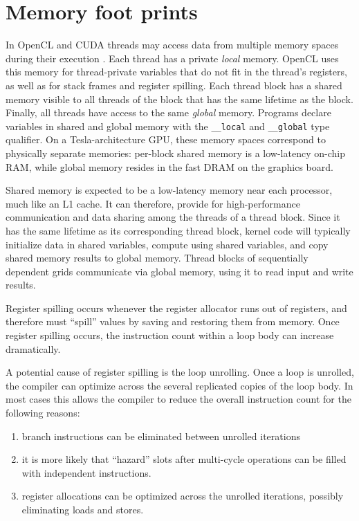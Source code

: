 \section{Memory foot prints}
In OpenCL and CUDA threads may access data from multiple memory spaces during their execution \cite{Nickolls2008}. Each thread has a private \textit{local} memory. 
OpenCL uses this memory for thread-private variables that do not fit in the thread's registers, as well as for stack frames and register spilling. Each thread block 
has a shared memory visible to all threads of the block that has the same lifetime as the block. Finally, all threads have access to the same \textit{global} memory. 
Programs declare variables in shared and global memory with the \texttt{\_\_local} and \texttt{\_\_global} type qualifier. On a Tesla-architecture GPU, these memory spaces correspond to 
physically separate memories: per-block shared memory is a low-latency on-chip RAM, while global memory resides in the fast DRAM on the graphics board. 

Shared memory is expected to be a low-latency memory near each processor, much like an L1 cache. It can therefore, provide for high-performance communication and
data sharing among the threads of a thread block. Since it has the same lifetime as its corresponding thread block, kernel code will typically initialize data in shared
variables, compute using shared variables, and copy shared memory results to global memory. Thread blocks of sequentially dependent grids communicate via global
memory, using it to read input and write results. 

Register spilling occurs whenever the register allocator runs out of registers, and therefore must ``spill'' values by saving and restoring them from memory. Once 
register spilling occurs, the instruction count within a loop body can increase dramatically. 
 
A potential cause of register spilling is the loop unrolling. Once a loop is unrolled, the compiler can optimize across the several replicated copies of the loop 
body. In most cases this allows the compiler to reduce the overall instruction count for the following reasons:
 
 \begin{enumerate}
  \item branch instructions can be eliminated between unrolled iterations
  \item it is more likely that ``hazard'' slots after multi-cycle operations can be filled with independent instructions. 
  \item register allocations can be optimized across the unrolled iterations, possibly eliminating loads and stores.
 \end{enumerate}


